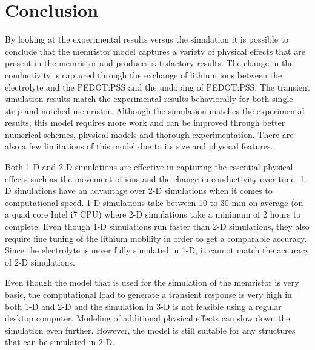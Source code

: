 
\chapter{Conclusion} %

\label{Chapter7} %


\begin{doublespace}

By looking at the experimental results versus the simulation it is possible to conclude that the memristor model captures a variety of physical effects that are present in the memristor and produces satisfactory results. The change in the conductivity is captured through the exchange of lithium ions between the electrolyte and the PEDOT:PSS and the undoping of PEDOT:PSS. The transient simulation results match the experimental results behaviorally for both single strip and notched memristor. Although the simulation matches the experimental results, this model requires more work and can be improved through better numerical schemes, physical models and thorough experimentation. There are also a few limitations of this model due to its size and physical features.

Both 1-D and 2-D simulations are effective in capturing the essential physical effects such as the movement of ions and the change in conductivity over time. 1-D simulations have an advantage over 2-D simulations when it comes to computational speed. 1-D simulations take between 10 to 30 min on average (on a quad core Intel i7 CPU) where 2-D simulations take a minimum of 2 hours to complete. Even though 1-D simulations run faster than 2-D simulations, they also require fine tuning of the lithium mobility in order to get a comparable accuracy. Since the electrolyte is never fully simulated in 1-D, it cannot match the accuracy of 2-D simulations.

Even though the model that is used for the simulation of the memristor is very basic, the computational load to generate a transient response is very high in both 1-D and 2-D and the simulation in 3-D is not feasible using a regular desktop computer. Modeling of additional physical effects can slow down the simulation even further. However, the model is still suitable for any structures that can be simulated in 2-D.  


\end{doublespace}
